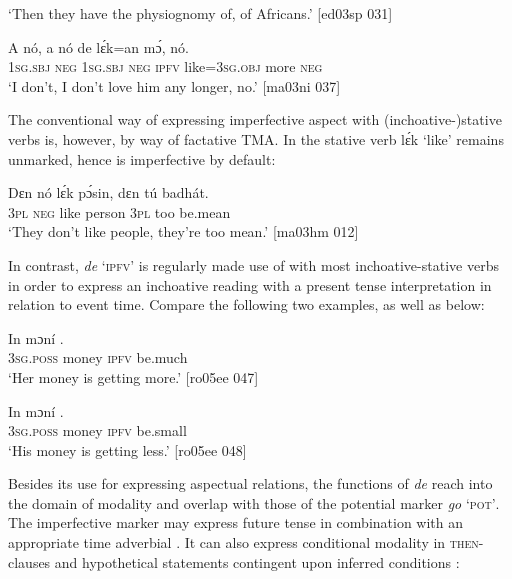 \glt ‘Then they have the physiognomy of, of Africans.’ [ed03sp 031]
\z


\ea%
    \label{ex:key:334}
    \gll A    nó,  a    nó  de  lɛ́k=an    mɔ́,    nó.\\
\textsc{1sg.sbj}  \textsc{neg}  \textsc{1sg.sbj}  \textsc{neg}  \textsc{ipfv}  like=\textsc{3sg.obj}  more  \textsc{neg}\\

\glt ‘I don’t, I don’t love him any longer, no.’ [ma03ni 037]
\z

The conventional way of expressing imperfective aspect with (inchoative-)stative verbs is, however, by way of factative TMA{\fff}. In  the stative verb lɛ́k ‘like’ remains unmarked, hence is imperfective by default:{\fff} 


\ea%
    \label{ex:key:335}
    \gll Dɛn    nó  lɛ́k  pɔ́sin,  dɛn  tú  badhát.\\
\textsc{3pl}    \textsc{neg}  like  person  \textsc{3pl}  too  be.mean\\

\glt ‘They don’t like people, they’re too mean.’ [ma03hm 012]
\z

In contrast, \textit{de} ‘\textsc{ipfv}’ is regularly made use of with most inchoative-stative verbs in order to express an inchoative reading with a present tense interpretation in relation to event time. Compare the following two examples, as well as  below: 


\ea%
    \label{ex:key:336}
    \gll In    mɔní   .\\
\textsc{3sg.poss}  money  \textsc{ipfv}  be.much\\

\glt ‘Her money is getting more.’ [ro05ee 047]
\z


\ea%
    \label{ex:key:337}
    \gll In    mɔní   .\\
\textsc{3sg.poss}  money  \textsc{ipfv}  be.small\\

\glt ‘His money is getting less.’ [ro05ee 048]
\z

Besides its use for expressing aspectual relations, the functions of \textit{de} reach into the domain of modality and overlap with those of the potential marker \textit{go} ‘\textsc{pot’}. The imperfective marker may express future tense in combination with an appropriate time adverbial . It can also express conditional modality in \textsc{then-}clauses and hypothetical statements contingent upon inferred conditions :



